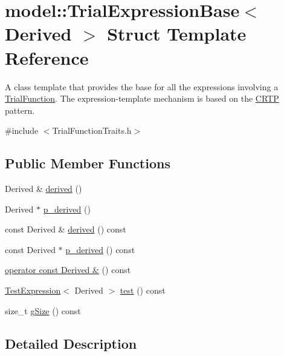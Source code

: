 \hypertarget{structmodel_1_1_trial_expression_base}{}\section{model\+:\+:Trial\+Expression\+Base$<$ Derived $>$ Struct Template Reference}
\label{structmodel_1_1_trial_expression_base}


A class template that provides the base for all the expressions involving a \hyperlink{classmodel_1_1_trial_function}{Trial\+Function}. The expression-\/template mechanism is based on the \hyperlink{classmodel_1_1_c_r_t_p}{C\+R\+T\+P} pattern.  




{\ttfamily \#include $<$Trial\+Function\+Traits.\+h$>$}

\subsection*{Public Member Functions}
\begin{DoxyCompactItemize}
\item 
Derived \& \hyperlink{structmodel_1_1_trial_expression_base_a81c178007b9d5a868ebb5a4a98fc8515}{derived} ()
\item 
Derived $\ast$ \hyperlink{structmodel_1_1_trial_expression_base_a1b5263a373827bbe4c9e523bf228a5d0}{p\+\_\+derived} ()
\item 
const Derived \& \hyperlink{structmodel_1_1_trial_expression_base_aa144620bea074e9d29df6a5a9917b0b2}{derived} () const 
\item 
const Derived $\ast$ \hyperlink{structmodel_1_1_trial_expression_base_afd9974dfb562034f2b2084a01c7b6d9d}{p\+\_\+derived} () const 
\item 
\hyperlink{structmodel_1_1_trial_expression_base_a32812dbaff551482a4a9efc3984028e4}{operator const Derived \&} () const 
\item 
\hyperlink{structmodel_1_1_test_expression}{Test\+Expression}$<$ Derived $>$ \hyperlink{structmodel_1_1_trial_expression_base_a90697992be2cd74f1d3b69fce5e44ab3}{test} () const 
\item 
size\+\_\+t \hyperlink{structmodel_1_1_trial_expression_base_a655724d1d07194bd17b66473b1bda5f8}{g\+Size} () const 
\end{DoxyCompactItemize}


\subsection{Detailed Description}
